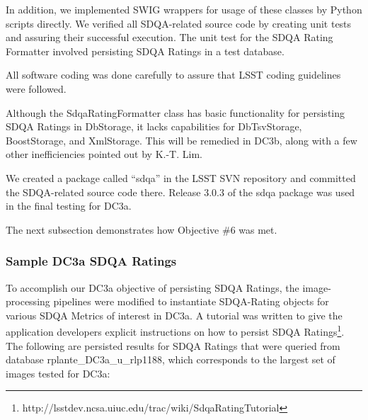 \noindent
In addition, we implemented SWIG wrappers for usage of these classes by Python scripts
directly.  We verified all SDQA-related source code by creating unit tests and assuring
their successful execution.  The unit test for the SDQA Rating Formatter involved 
persisting SDQA Ratings in a test database.  

All software coding was done carefully to assure that LSST coding guidelines were followed.

Although the SdqaRatingFormatter class has basic functionality for persisting SDQA Ratings
in DbStorage, it lacks capabilities for DbTsvStorage, BoostStorage, and XmlStorage.  This
will be remedied in DC3b, along with a few other inefficiencies pointed out by K.-T. Lim.

We created a package called ``sdqa'' in the LSST SVN repository and committed the SDQA-related source code there.  Release 3.0.3 of the sdqa package was used in the 
final testing for DC3a.

The next subsection demonstrates how Objective \#6 was met.


\subsubsection{Sample DC3a SDQA Ratings}

To accomplish our DC3a objective of persisting SDQA Ratings, the image-processing pipelines
were modified to instantiate SDQA-Rating objects for various SDQA Metrics of interest in
DC3a.  A tutorial was written to give the application developers explicit instructions on 
how to persist 
SDQA Ratings\footnote{http://lsstdev.ncsa.uiuc.edu/trac/wiki/SdqaRatingTutorial}.
The following are persisted results for SDQA Ratings that were queried from database
rplante\_DC3a\_u\_rlp1188, which corresponds to the largest set of images tested for DC3a:

